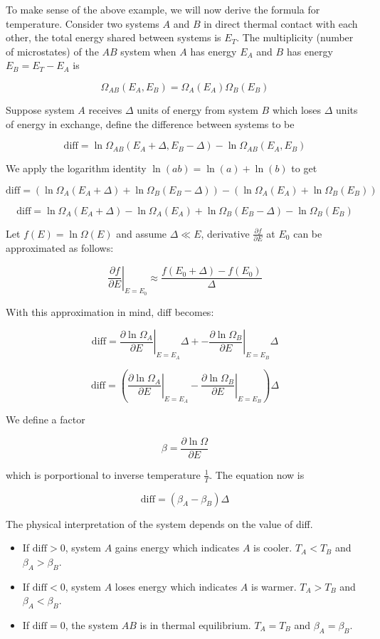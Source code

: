 To make sense of the above example, we will now derive the formula for temperature. Consider two systems $A$ and $B$ in direct thermal contact with each other, the total energy shared between systems is $E_T$. The multiplicity (number of microstates) of the $AB$ system when $A$ has energy $E_A$ and $B$ has energy $E_B=E_T-E_A$ is

$$\Omega_{AB}(E_A, E_B)=\Omega_A(E_A)\Omega_B(E_B)$$

Suppose system $A$ receives $\Delta$ units of energy from system $B$ which loses $\Delta$ units of energy in exchange, define the difference between systems to be

$$\text{diff}=\ln\Omega_{AB}(E_A+\Delta, E_B-\Delta)-\ln\Omega_{AB}(E_A, E_B)$$

We apply the logarithm identity $\ln(ab)=\ln(a)+\ln(b)$ to get

$$\text{diff}=(\ln\Omega_A(E_A+\Delta)+\ln\Omega_B(E_B-\Delta))-(\ln\Omega_A(E_A)+\ln\Omega_B(E_B))$$

$$\text{diff}=\ln\Omega_A(E_A+\Delta)-\ln\Omega_A(E_A)+\ln\Omega_B(E_B-\Delta)-\ln\Omega_B(E_B)$$

Let $f(E)=\ln\Omega(E)$ and assume $\Delta\ll E$, derivative $\frac{\partial f}{\partial E}$ at $E_0$ can be approximated as follows:

$$\left.\frac{\partial f}{\partial E}\right\vert_{E=E_0} \approx \frac{f(E_0+\Delta)-f(E_0)}{\Delta}$$

With this approximation in mind, diff becomes:

$$\text{diff}=\left.\frac{\partial \ln\Omega_A}{\partial E}\right\vert_{E=E_A}\Delta+-\left.\frac{\partial \ln\Omega_B}{\partial E}\right\vert_{E=E_B}\Delta$$

$$\text{diff}=\left(\left.\frac{\partial \ln\Omega_A}{\partial E}\right\vert_{E=E_A}-\left.\frac{\partial \ln\Omega_B}{\partial E}\right\vert_{E=E_B}\right)\Delta$$

We define a factor

$$\beta=\frac{\partial \ln\Omega}{\partial E}$$

which is porportional to inverse temperature $\frac{1}{T}$. The equation now is

$$\boxed{\text{diff}=\left(\beta_A-\beta_B\right)\Delta}$$

The physical interpretation of the system depends on the value of diff.

\begin{itemize}
	\item If $\text{diff}>0$, system $A$ gains energy which indicates $A$ is cooler. $T_A<T_B$ and $\beta_A>\beta_B$.
	\item If $\text{diff}<0$, system $A$ loses energy which indicates $A$ is warmer. $T_A>T_B$ and $\beta_A<\beta_B$.
	\item If $\text{diff}=0$, the system $AB$ is in thermal equilibrium. $T_A=T_B$ and $\beta_A=\beta_B$.
\end{itemize}

